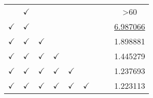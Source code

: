 \begin{table}
\begin{threeparttable}
\begin{tabular}{ccccccccc}
              & $\checkmark$                                     &                                                   &                                                 &                                                   &                                                  &                                                   &                                                 & \textgreater{}60     \\
$\checkmark$ & $\checkmark$                                     &                                                  &                                                 &                                                   &                                                  &                                                   &                                                 & \underline{6.987066} \\
$\checkmark$ & $\checkmark$                                     &$\checkmark$                                                   &                                                 &                                                   &                                                  &                                                   &                                                 & 1.898881 \\
$\checkmark$ & $\checkmark$                                     &$\checkmark$                                                   & $\checkmark$                                    &                                                   &                                                  &                                                   &                                                 & 1.445279       \\
$\checkmark$ & $\checkmark$                                     &$\checkmark$                                                   & $\checkmark$                                    & $\checkmark$                                      &                                                  &                                                   &                                                 & 1.237693       \\
$\checkmark$ & $\checkmark$                                     &$\checkmark$                                                   & $\checkmark$                                    & $\checkmark$                                      & $\checkmark$                                     &                                                   &                                                 & 1.223113       \\

\end{tabular}
\end{threeparttable}
\end{table}
